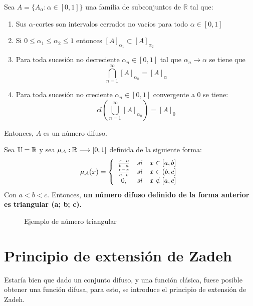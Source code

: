   \begin{teorema}
    Sea $A=\{A_\alpha : \alpha \in [0, 1]\}$ una familia de subconjuntos de $\mathbb{R}$ tal que:
    
    \begin{enumerate}
    \item Sus $\alpha$-cortes son intervalos cerrados no vacíos para todo $\alpha \in [0, 1]$
    \item Si $0 \leq \alpha_1 \leq \alpha_2 \leq 1$ entonces $[A]_{\alpha_1} \subset [A]_{\alpha_2}$
    \item Para toda sucesión no decreciente $\alpha_n \in [0, 1]$ tal que $\alpha_n \longrightarrow \alpha$ se tiene que
      $$
      \bigcap^\infty_{n=1} [A]_{\alpha_n}=[A]_\alpha
      $$
    \item Para toda sucesión no creciente $\alpha_n \in [0, 1]$ convergente a $0$ se tiene:
      $$
      cl\left(\bigcup^\infty_{n=1} [A]_{\alpha_n}\right)=[A]_0
      $$
    \end{enumerate}
    Entonces, $A$ es un número difuso.
  \end{teorema}


  \begin{ejemplo}
    Sea $\mathbb U=\mathbb R$ y sea $\mu_\mathcal{A}: \mathbb R \longrightarrow [0, 1]$ definida de la siguiente forma:
    $$
    \mu_\mathcal{A}(x)=\left\{
    \begin{array}{c c c}
      \frac{x-a}{b-a} & si & x \in [a, b] \\
      \frac{c-x}{c-b} & si & x \in (b, c] \\
	0, & si & x \notin [a, c]
    \end{array}
    \right.
    $$
    Con $a < b < c$. Entonces, \textbf{un número difuso definido de la forma anterior es triangular (a; b; c).} 
    
    \begin{figure}[h]
      \centering
      \caption{Ejemplo de número triangular}
      \label{fig:numero_difuso}
    \end{figure}
    
  \end{ejemplo}


  \section{Principio de extensión de Zadeh}
  Estaría bien que dado un conjunto difuso, y una función clásica, fuese posible obtener una función difusa, para esto, se introduce el principio de extensión de Zadeh.

